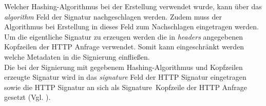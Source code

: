 	Welcher Hashing-Algorithmus bei der Erstellung verwendet wurde, kann über das \textit{algorithm} Feld der Signatur nachgeschlagen werden. Zudem muss der Algorithmus bei Erstellung in dieses Feld zum Nachschlagen eingetragen werden.\\
	
	Um die eigentliche Signatur zu erzeugen werden die in \textit{headers} angegebenen Kopfzeilen der HTTP Anfrage verwendet. Somit kann eingeschränkt werden welche Metadaten in die Signierung einfließen.\\
	
	Die bei der Signierung mit gegebenem Hashing-Algorithmus und Kopfzeilen erzeugte Signatur wird in das \textit{signature} Feld der HTTP Signatur eingetragen sowie die HTTP Signatur an sich als \glqq Signature\grqq~Kopfzeile der HTTP Anfrage gesetzt (Vgl. \cite{http-signature}).
